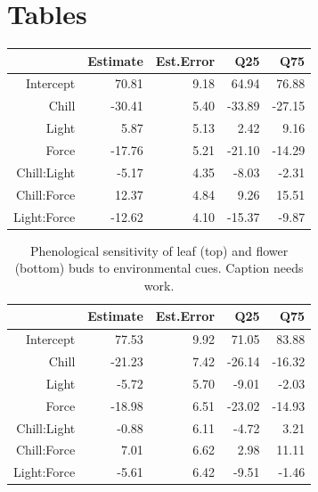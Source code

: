 \documentclass[11pt]{article}\usepackage[]{graphicx}\usepackage[]{color}
\begin{document}
{\section*{Tables}
\begin{table}[ht]
\centering
\begin{tabular}{rrrrr}
  \hline
 & Estimate & Est.Error & Q25 & Q75 \\ 
  \hline
Intercept & 70.81 & 9.18 & 64.94 & 76.88 \\ 
  Chill & -30.41 & 5.40 & -33.89 & -27.15 \\ 
  Light & 5.87 & 5.13 & 2.42 & 9.16 \\ 
  Force & -17.76 & 5.21 & -21.10 & -14.29 \\ 
  Chill:Light & -5.17 & 4.35 & -8.03 & -2.31 \\ 
  Chill:Force & 12.37 & 4.84 & 9.26 & 15.51 \\ 
  Light:Force & -12.62 & 4.10 & -15.37 & -9.87 \\ 
   \hline
\end{tabular}
\end{table}
\begin{table}[ht]
\centering
\begin{tabular}{rrrrr}
  \hline
 & Estimate & Est.Error & Q25 & Q75 \\ 
  \hline
Intercept & 77.53 & 9.92 & 71.05 & 83.88 \\ 
  Chill & -21.23 & 7.42 & -26.14 & -16.32 \\ 
  Light & -5.72 & 5.70 & -9.01 & -2.03 \\ 
  Force & -18.98 & 6.51 & -23.02 & -14.93 \\ 
  Chill:Light & -0.88 & 6.11 & -4.72 & 3.21 \\ 
  Chill:Force & 7.01 & 6.62 & 2.98 & 11.11 \\ 
  Light:Force & -5.61 & 6.42 & -9.51 & -1.46 \\ 
   \hline
\end{tabular}
\caption{Phenological sensitivity of leaf (top) and flower (bottom) buds to environmental cues. Caption needs work.} 
\label{tab:modelests}
\end{table}


}
\end{document}
